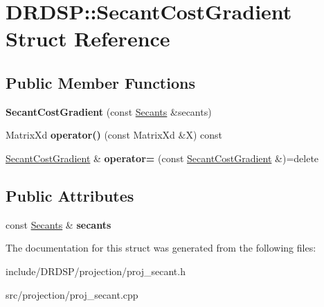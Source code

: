 \hypertarget{struct_d_r_d_s_p_1_1_secant_cost_gradient}{\section{D\-R\-D\-S\-P\-:\-:Secant\-Cost\-Gradient Struct Reference}
\label{struct_d_r_d_s_p_1_1_secant_cost_gradient}
}
\subsection*{Public Member Functions}
\begin{DoxyCompactItemize}
\item 
\hypertarget{struct_d_r_d_s_p_1_1_secant_cost_gradient_a2587363d1bfdf4b981276b18bfae1936}{{\bfseries Secant\-Cost\-Gradient} (const \hyperlink{struct_d_r_d_s_p_1_1_secants}{Secants} \&secants)}\label{struct_d_r_d_s_p_1_1_secant_cost_gradient_a2587363d1bfdf4b981276b18bfae1936}

\item 
\hypertarget{struct_d_r_d_s_p_1_1_secant_cost_gradient_a2323e393882ab1cd60fb1bb61b587a92}{Matrix\-Xd {\bfseries operator()} (const Matrix\-Xd \&X) const }\label{struct_d_r_d_s_p_1_1_secant_cost_gradient_a2323e393882ab1cd60fb1bb61b587a92}

\item 
\hypertarget{struct_d_r_d_s_p_1_1_secant_cost_gradient_a0cb0bc11cc41452cde8eb15c623c8ea5}{\hyperlink{struct_d_r_d_s_p_1_1_secant_cost_gradient}{Secant\-Cost\-Gradient} \& {\bfseries operator=} (const \hyperlink{struct_d_r_d_s_p_1_1_secant_cost_gradient}{Secant\-Cost\-Gradient} \&)=delete}\label{struct_d_r_d_s_p_1_1_secant_cost_gradient_a0cb0bc11cc41452cde8eb15c623c8ea5}

\end{DoxyCompactItemize}
\subsection*{Public Attributes}
\begin{DoxyCompactItemize}
\item 
\hypertarget{struct_d_r_d_s_p_1_1_secant_cost_gradient_a8620cf3251ef7fc475cd713b74ad3770}{const \hyperlink{struct_d_r_d_s_p_1_1_secants}{Secants} \& {\bfseries secants}}\label{struct_d_r_d_s_p_1_1_secant_cost_gradient_a8620cf3251ef7fc475cd713b74ad3770}

\end{DoxyCompactItemize}


The documentation for this struct was generated from the following files\-:\begin{DoxyCompactItemize}
\item 
include/\-D\-R\-D\-S\-P/projection/proj\-\_\-secant.\-h\item 
src/projection/proj\-\_\-secant.\-cpp\end{DoxyCompactItemize}
